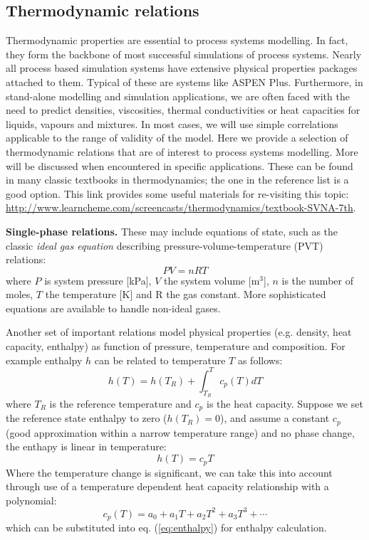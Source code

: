 \documentclass[a4paper,11pt]{article}
\theoremstyle{definition}
\begin{document}
\subsection{Thermodynamic relations}

Thermodynamic properties are essential to process systems modelling.
In fact, they form the backbone of most successful simulations of process systems.
Nearly all process based simulation systems have extensive physical properties packages attached to them.
Typical of these are systems like ASPEN Plus. Furthermore, in stand-alone modelling and simulation applications,
we are often faced with the need to predict densities, viscosities, thermal conductivities or heat capacities for liquids, vapours and mixtures. 
In most cases, we will use simple correlations applicable to the range of validity of the model. Here we provide a selection of
thermodynamic relations that are of interest to process systems modelling. More will be discussed when encountered in specific
applications. These can be found in many classic textbooks in thermodynamics; the one in the reference list is a good option.
This link provides some useful materials for re-visiting this topic: \url{http://www.learncheme.com/screencasts/thermodynamics/textbook-SVNA-7th}.

\textbf{Single-phase relations.} These may include equations of state, such as the classic \emph{ideal gas equation} describing pressure-volume-temperature (PVT)
relations:
\begin{equation}
	P V = n R T
\end{equation}
\noindent where $P$ is system pressure [kPa], $V$ the system volume [m$^3$], $n$ is the number of moles, 
$T$ the temperature [K] and R the gas constant. More sophisticated equations are available
to handle non-ideal gases.

Another set of important relations model physical properties (e.g. density, heat capacity, enthalpy) as function of 
pressure, temperature and composition. For example enthalpy $h$ can be related to temperature $T$ as follows:
\begin{equation} \label{eq:enthalpy}
	h(T) = h(T_R) + \int_{T_R}^T c_p(T) d T
\end{equation}
\noindent where $T_R$ is the reference temperature and $c_p$ is the heat capacity. Suppose we set the reference state enthalpy
to zero ($h(T_R)=0$), and assume a constant $c_p$ (good approximation within a narrow temperature range) and no phase change,
the enthapy is linear in temperature: 
\begin{equation}
	h(T) = c_p T
\end{equation}
\noindent Where the temperature change is significant, we can take this into account
through use of a temperature dependent heat capacity relationship with a polynomial:
\begin{equation}
	c_p(T) = a_0 + a_1 T + a_2 T^2 + a_3 T^3 + \cdots
\end{equation}
\noindent which can be substituted into eq. (\ref{eq:enthalpy}) for enthalpy calculation.
\end{document}
